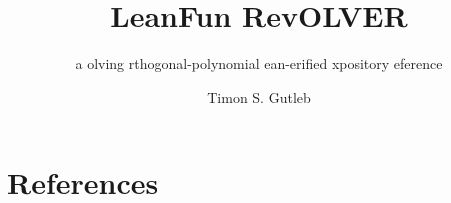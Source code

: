 \documentclass{report}
\title{LeanFun RevOLVER}
\subtitle{a \rvRev{Rev}olving \rvAcr{O}rthogonal-polynomial \rvAcr{L}ean-\rvAcr{V}erified \rvAcr{E}xpository \rvAcr{R}eference}
\author{Timon S. Gutleb}
\begin{document}
\maketitle
\tableofcontents

\part*{References}

\end{document}
